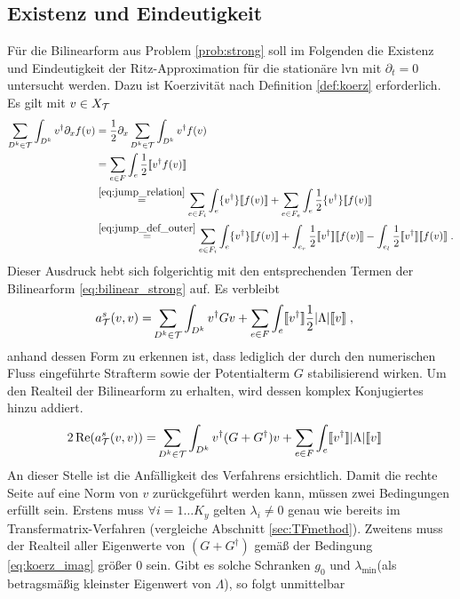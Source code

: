 \subsection{Existenz und Eindeutigkeit}
Für die Bilinearform aus Problem \ref{prob:strong} soll im Folgenden die Existenz und Eindeutigkeit der Ritz-Approximation für die stationäre \ac{lvn} mit $\partial_t=0$ untersucht werden. Dazu ist Koerzivität nach Definition \ref{def:koerz} erforderlich. Es gilt mit $v\in X_{\mathcal{T}}$
\begin{align*}
  \sum_{D^k\in\mathcal{T}}\int_{D^k} v^{\dagger} \partial_x f(v) &=
  \frac{1}{2}\partial_x \sum_{D^k\in\mathcal{T}}\int_{D^k} v^{\dagger} f(v) \\
  &= \sum_{e\in F}\int_e \frac{1}{2}\llbracket v^{\dagger} f(v) \rrbracket \\
  &\stackrel{\eqref{eq:jump_relation}}{=}  \sum_{e\in F_i}\int_e \{ v^{\dagger} \} \llbracket f(v) \rrbracket + \sum_{e\in F_e}\int_{e} \frac{1}{2}\{ v^{\dagger} \} \llbracket f(v) \rrbracket \\
  &\stackrel{\eqref{eq:jump_def_outer}}{=} \sum_{e\in F_i}\int_e \{ v^{\dagger} \} \llbracket f(v) \rrbracket + \int_{e_r}\frac{1}{2} \llbracket v^{\dagger} \rrbracket\llbracket f(v) \rrbracket - \int_{e_l}\frac{1}{2} \llbracket v^{\dagger} \rrbracket\llbracket f(v) \rrbracket \; .
\end{align*}
Dieser Ausdruck hebt sich folgerichtig mit den entsprechenden Termen der Bilinearform \eqref{eq:bilinear_strong} auf. Es verbleibt
\begin{equation}
  \begin{aligned}
    a_{\mathcal{T}}^s(v, v) = &\sum_{D^k\in\mathcal{T}}\int_{D^k} v^{\dagger} G v
    + \sum_{e\in F}\int_e  \llbracket v^{\dagger} \rrbracket \frac{1}{2}|\Lambda| \llbracket v \rrbracket \; ,
  \end{aligned}
\end{equation}
anhand dessen Form zu erkennen ist, dass lediglich der durch den numerischen Fluss eingeführte Strafterm sowie der Potentialterm $G$ stabilisierend wirken. Um den Realteil der Bilinearform zu erhalten, wird dessen komplex Konjugiertes hinzu addiert.
\begin{equation}
  \begin{aligned}
    2\operatorname{Re} (a_{\mathcal{T}}^s(v, v)) = &\sum_{D^k\in\mathcal{T}}\int_{D^k} v^{\dagger} (G+G^{\dagger}) v
    + \sum_{e\in F}\int_e  \llbracket v^{\dagger} \rrbracket |\Lambda| \llbracket v \rrbracket
  \end{aligned}
  \label{eq:koerz_result}
\end{equation}
An dieser Stelle ist die Anfälligkeit des Verfahrens ersichtlich. Damit die rechte Seite auf eine Norm von $v$ zurückgeführt werden kann, müssen zwei Bedingungen erfüllt sein. Erstens muss $\forall i=1\dots K_y$ gelten $\lambda_i\neq 0$ genau wie bereits im Transfermatrix-Verfahren (vergleiche Abschnitt \ref{sec:TFmethod}). Zweitens muss der Realteil aller Eigenwerte von $(G+G^{\dagger})$ gemäß der Bedingung \eqref{eq:koerz_imag} größer 0 sein. Gibt es solche Schranken $g_0$ und $\lambda_{\text{min}}$(als betragsmäßig kleinster Eigenwert von $\Lambda$), so folgt unmittelbar
